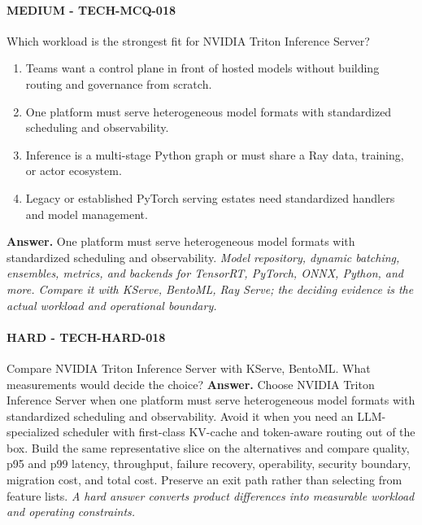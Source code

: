\paragraph{MEDIUM - TECH-MCQ-018} Which workload is the strongest fit for NVIDIA Triton Inference Server?
\begin{enumerate}[label=\Alph*.]
\item Teams want a control plane in front of hosted models without building routing and governance from scratch.
\item One platform must serve heterogeneous model formats with standardized scheduling and observability.
\item Inference is a multi-stage Python graph or must share a Ray data, training, or actor ecosystem.
\item Legacy or established PyTorch serving estates need standardized handlers and model management.
\end{enumerate}
\textbf{Answer.} One platform must serve heterogeneous model formats with standardized scheduling and observability.
\textit{Model repository, dynamic batching, ensembles, metrics, and backends for TensorRT, PyTorch, ONNX, Python, and more. Compare it with KServe, BentoML, Ray Serve; the deciding evidence is the actual workload and operational boundary.}
\paragraph{HARD - TECH-HARD-018} Compare NVIDIA Triton Inference Server with KServe, BentoML. What measurements would decide the choice?
\textbf{Answer.} Choose NVIDIA Triton Inference Server when one platform must serve heterogeneous model formats with standardized scheduling and observability. Avoid it when you need an LLM-specialized scheduler with first-class KV-cache and token-aware routing out of the box. Build the same representative slice on the alternatives and compare quality, p95 and p99 latency, throughput, failure recovery, operability, security boundary, migration cost, and total cost. Preserve an exit path rather than selecting from feature lists.
\textit{A hard answer converts product differences into measurable workload and operating constraints.}
